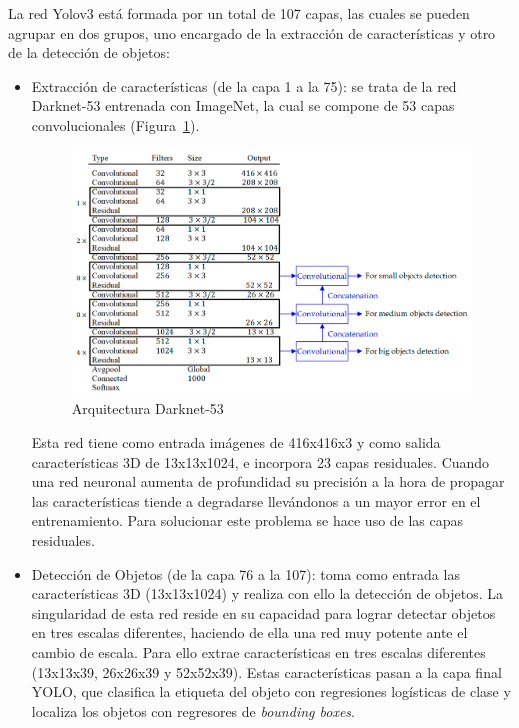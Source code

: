 La red Yolov3 está formada por un total de 107 capas,  las cuales se pueden agrupar en dos grupos, uno encargado de la extracción de características y otro de la detección de objetos:

\begin{itemize}
    \item Extracción de características (de la capa 1 a la 75): se trata de la red Darknet-53 entrenada con ImageNet, la cual se compone de 53 capas convolucionales (Figura~\ref{fig.darknet53}).
    \begin{figure}[H] 
\begin{center}
	\includegraphics[scale=1]{figures/Diseno_global/darket53.png}
   \caption{Arquitectura Darknet-53}
	\label{fig.darknet53}
\end{center}
\end{figure}
	Esta red tiene como entrada imágenes de 416x416x3 y como salida características 3D de 13x13x1024, e incorpora 23 capas residuales. Cuando una red neuronal aumenta de profundidad su precisión a la hora de propagar las características tiende a degradarse llevándonos a un mayor error en el entrenamiento. Para solucionar este problema se hace uso de las capas residuales.
    \item Detección de Objetos (de la capa 76 a la 107): toma como entrada las características 3D (13x13x1024) y realiza con ello la detección de objetos. La singularidad de esta red reside en su capacidad para lograr detectar objetos en tres escalas diferentes, haciendo de ella una red muy potente ante el cambio de escala. Para ello extrae características en tres escalas diferentes (13x13x39, 26x26x39 y 52x52x39). Estas características pasan a la capa final YOLO, que clasifica la etiqueta del objeto con regresiones logísticas de clase y localiza los objetos con regresores de \textit{bounding boxes}.

\end{itemize}


